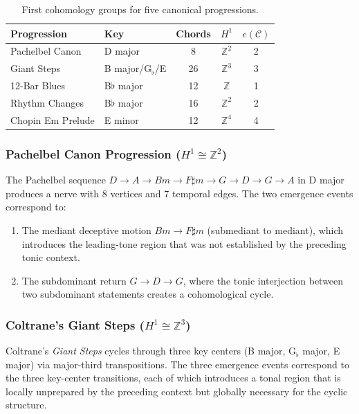 \documentclass[12pt,a4paper]{article}
\newcommand{\ZZ}{\mathbb{Z}}
\newcommand{\Hone}{H^{1}}
\begin{document}
\begin{table}[ht]
  \centering
  \caption{First cohomology groups for five canonical progressions.}
  \label{tab:results}
  \begin{tabular}{@{}llccc@{}}
    \toprule
    \textbf{Progression} & \textbf{Key} & \textbf{Chords} & $\Hone$ & $e(\mathcal{C})$ \\
    \midrule
    Pachelbel Canon & D major & 8 & $\ZZ^{2}$ & 2 \\
    Giant Steps & B major/G$_\flat$/E & 26 & $\ZZ^{3}$ & 3 \\
    12-Bar Blues & B$\flat$ major & 12 & $\ZZ$ & 1 \\
    Rhythm Changes & B$\flat$ major & 16 & $\ZZ^{2}$ & 2 \\
    Chopin Em Prelude & E minor & 12 & $\ZZ^{4}$ & 4 \\
    \bottomrule
  \end{tabular}
\end{table}

\subsubsection{Pachelbel Canon Progression ($\Hone \cong \ZZ^{2}$)}

The Pachelbel sequence $D \to A \to Bm \to F\sharp m \to G \to D \to G \to A$ in D major 
produces a nerve with 8 vertices and 7 temporal edges. The two emergence events correspond to:
\begin{enumerate}
  \item The mediant deceptive motion $Bm \to F\sharp m$ (submediant to mediant), which 
    introduces the leading-tone region that was not established by the preceding tonic context.
  \item The subdominant return $G \to D \to G$, where the tonic interjection between two 
    subdominant statements creates a cohomological cycle.
\end{enumerate}

\subsubsection{Coltrane's Giant Steps ($\Hone \cong \ZZ^{3}$)}

Coltrane's \emph{Giant Steps} cycles through three key centers (B major, G$_\flat$ major, 
E major) via major-third transpositions. The three emergence events correspond to the three 
key-center transitions, each of which introduces a tonal region that is locally unprepared 
by the preceding context but globally necessary for the cyclic structure.
\end{document}
